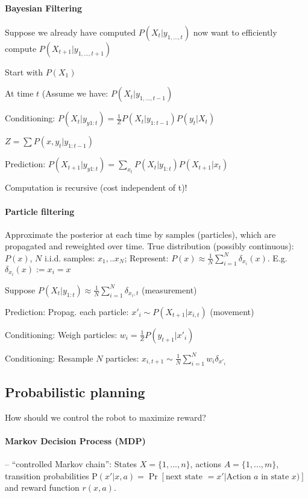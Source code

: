 \documentclass[a4paper, 10pt]{scrartcl}
\newcommand{\uP}{\mathrm P}
\begin{document}
\begin{multicols*}{3}
\paragraph{Bayesian Filtering}
Suppose we already have computed $P(X_t | y_{1,\dots,t})$ now want to efficiently compute $P(X_{t+1} | y_{1,...,t+1})$

\begin{compactitem}
	\item Start with $P(X_1)$
	\item At time $t$ (Assume we have:  $P(X_t | y_{1,...,t-1})$
	\item Conditioning: $P(X_t | y_{y1:t}) = \frac{1}{Z} P(X_t | y_{1:t-1})P(y_t | X_t)$
	\item $Z= \sum P(x,y_t | y_{1:t-1})$
	\item Prediction: $P(X_{t+1} | y_{y1:t}) = \sum_{x_t}  P(X_t | y_{1:t}) P(X_{t+1} | x_t)$
\end{compactitem}
Computation is recursive (cost independent of t)!

\paragraph{Particle filtering}
Approximate the posterior at each time by samples (particles), which are propagated and reweighted over time.
True distribution (possibly continuous): $P(x)$, $N$ i.i.d. samples: $x_1,..x_N$; Represent: $P(x) \approx \frac{1}{N} \sum_{i=1}^{N} \delta_{x_i}(x)$. E.g. $\delta_{x_i}(x):= x_i = x$

\begin{compactitem}
	\item Suppose $P(X_t | y_{1:t}) \approx \frac{1}{N} \sum_{i=1}^{N} \delta_{x_i, t}$ (measurement)
	\item Prediction: Propag. each particle: $x'_i \sim P(X_{t+1} | x_{i,t})$ (movement)
	\item Conditioning: Weigh particles: $w_i = \frac{1}{Z}P(y_{t+1} | x'_i)$
	\item Conditioning: Resample $N$ particles: $x_{i, t+1} \sim \frac{1}{N} \sum_{i=1}^{N} w_i\delta_{x'_i}$ 
\end{compactitem}

\subsection{Probabilistic planning}
How should we control the robot to maximize reward?

\paragraph{Markov Decision Process (MDP)} -- ``controlled Markov chain'':
States $X=\{1,...,n\}$, actions $A=\{1,...,m\}$, transition probabilities $\uP(x' | x, a) = \Pr[\text{next state } = x' | \text{Action } a \text{ in state } x)]$ and reward function $r(x,a)$.


\end{multicols*}
\end{document}
